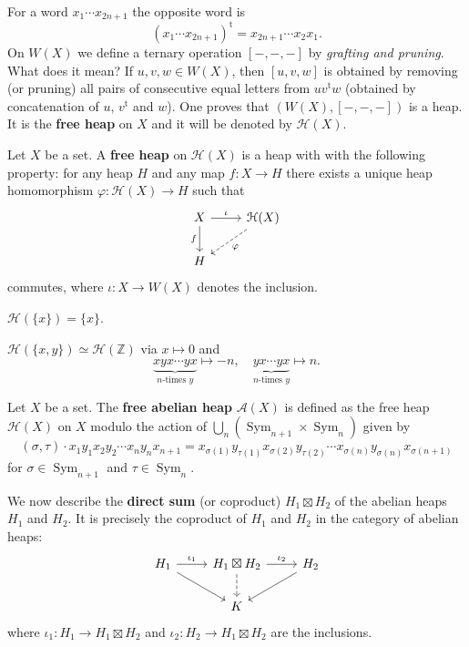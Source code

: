 \documentclass{svmult}
\newcommand{\Z}{\mathbb{Z}}
\newcommand{\Sym}{\operatorname{Sym}}
\begin{document}
For a word $x_1\cdots x_{2n+1}$ the opposite 
word is 
\[
(x_1\cdots x_{2n+1})^{\operatorname{t}}=x_{2n+1}\cdots x_2x_1.
\]
On $W(X)$ we define a ternary operation $[-,-,-]$ by \emph{grafting and pruning}. What does it mean? 
If $u,v,w\in W(X)$, then $[u,v,w]$ is obtained by removing (or pruning) all 
pairs of consecutive equal letters from $uv^{\operatorname{t}}w$ (obtained by
concatenation of $u$, $v^{\operatorname{t}}$ and $w$). One
proves that $\left(W(X),[-,-,-]\right)$ is a heap. It is the \textbf{free heap} on 
$X$ and it will be denoted by $\mathcal{H}(X)$. 

\begin{definition}
    Let $X$ be a set. A \textbf{free heap} on $\mathcal{H}(X)$ is a heap with with the following
    property: for any heap $H$ and any map $f\colon X\to H$ there exists a unique
    heap homomorphism $\varphi\colon \mathcal{H}(X)\to H$ such that
\[\begin{tikzcd}
	X & {\mathcal{H}(X)} \\
	H
	\arrow["\iota", from=1-1, to=1-2]
	\arrow["f"', from=1-1, to=2-1]
	\arrow["{\varphi }", dashed, from=1-2, to=2-1]
\end{tikzcd}\]
    commutes, where $\iota\colon X\to W(X)$ denotes the inclusion. 
\end{definition}

\begin{example}
        $\mathcal{H}(\{x\})=\{x\}$.
\end{example}

\begin{example}
        $\mathcal{H}(\{x,y\})\simeq \mathcal{H}(\Z)$ via $x\mapsto 0$ and
        \[
        \underbrace{xyx\cdots yx}_{\text{$n$-times $y$}}\mapsto -n,
        \quad
        \underbrace{yx\cdots yx}_{\text{$n$-times $y$}}\mapsto n.
        \]
\end{example}

\begin{example}
    Let $X$ be a set. The \textbf{free abelian heap} $\mathcal{A}(X)$ 
    is defined as the free heap $\mathcal{H}(X)$ on $X$ modulo
    the action of 
    $\bigcup_{n}\left(\Sym_{n+1}\times\Sym_n\right)$ given by 
    \[
    (\sigma,\tau)\cdot x_1y_1x_2y_2\cdots x_ny_nx_{n+1}
    =x_{\sigma(1)}y_{\tau(1)}x_{\sigma(2)}y_{\tau(2)}\cdots x_{\sigma(n)}y_{\sigma(n)}x_{\sigma(n+1)}
    \]
    for $\sigma\in\Sym_{n+1}$ and $\tau\in\Sym_{n}$. 
\end{example}

We now describe the \textbf{direct sum} (or coproduct) $H_1\boxtimes H_2$ of the 
abelian heaps $H_1$ and $H_2$. 
It is precisely the coproduct of 
$H_1$ and $H_2$ in the category of abelian heaps:
\[\begin{tikzcd}
	{H_1} & {H_1\boxtimes H_2} & {H_2} \\
	& K
	\arrow["{\iota_2}", from=1-2, to=1-3]
	\arrow[dashed, from=1-2, to=2-2]
	\arrow[from=1-3, to=2-2]
	\arrow["{\iota_1}", from=1-1, to=1-2]
	\arrow[from=1-1, to=2-2]
\end{tikzcd}\]
where  
$\iota_1\colon H_1\to H_1\boxtimes H_2$ and 
$\iota_2\colon H_2\to H_1\boxtimes H_2$ are the inclusions. 
\end{document}
